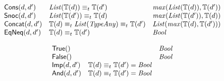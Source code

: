 \documentclass[fleqn,a4paper,dvips]{article}
\newcommand{\aterm}[1]{\mathsf{#1}}
\newcommand{\type}{\mathbb{T}}
\newcommand{\List}{\nm{List}}
\newcommand{\TypeAny}{\nm{TypeAny}}
\newcommand{\typecompat}{\equiv_t}
\begin{document}
\begin{displaymath}
\begin{array}{lll}
\aterm{Cons}(d, d')                  & \List(\type(d))\typecompat\type(d')                        & \nm{max}(\List(\type(d)),\type(d'))\\
\aterm{Snoc}(d, d')                  & \List(\type(d'))\typecompat\type(d)                        & \nm{max}(\List(\type(d')),\type(d))\\
\aterm{Concat}(d, d')                & \type(d)\typecompat\List(\TypeAny)\typecompat\type(d')     & \List(\nm{max}(\type(d),\type(d')))\\
\aterm{EqNeq}(d, d')                 & \type(d)\typecompat\type(d')                               & \Bool
\end{array}
\end{displaymath}

\begin{displaymath}
\begin{array}{lll}
\aterm{True}()                       &                                                            & \Bool\\
\aterm{False}()                      &                                                            & \Bool\\
\aterm{Imp}(d, d')                   & \type(d)\typecompat\type(d')=\Bool                         &\\
\aterm{And}(d, d')                   & \type(d)\typecompat\type(d')=\Bool                         &
\end{array}
\end{displaymath}
\end{document}
